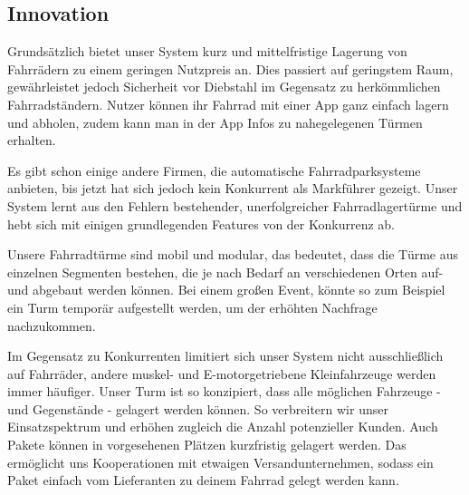 \subsection{Innovation}

Grundsätzlich bietet unser System kurz und mittelfristige Lagerung von Fahrrädern zu einem geringen Nutzpreis an. Dies passiert auf geringstem Raum, gewährleistet jedoch Sicherheit vor Diebstahl im Gegensatz zu herkömmlichen Fahrradständern. Nutzer können ihr Fahrrad mit einer App ganz einfach lagern und abholen, zudem kann man in der App Infos zu nahegelegenen Türmen erhalten.


Es gibt schon einige andere Firmen, die automatische Fahrradparksysteme anbieten, bis jetzt hat sich jedoch kein Konkurrent als Markführer gezeigt. Unser System lernt aus den Fehlern bestehender, unerfolgreicher Fahrradlagertürme und hebt sich mit einigen grundlegenden Features von der Konkurrenz ab.


Unsere Fahrradtürme sind mobil und modular, das bedeutet, dass die Türme aus einzelnen Segmenten bestehen, die je nach Bedarf an verschiedenen Orten auf- und abgebaut werden können. Bei einem großen Event, könnte so zum Beispiel ein Turm temporär aufgestellt werden, um der erhöhten Nachfrage nachzukommen.


Im Gegensatz zu Konkurrenten limitiert sich unser System nicht ausschließlich auf Fahrräder, andere muskel- und E-motorgetriebene Kleinfahrzeuge werden immer häufiger. Unser Turm ist so konzipiert, dass alle möglichen Fahrzeuge - und Gegenstände - gelagert werden können. So verbreitern wir unser Einsatzspektrum und erhöhen zugleich die Anzahl potenzieller Kunden. Auch Pakete können in vorgesehenen Plätzen kurzfristig gelagert werden. Das ermöglicht uns Kooperationen mit etwaigen Versandunternehmen, sodass ein Paket einfach vom Lieferanten zu deinem Fahrrad gelegt werden kann.

